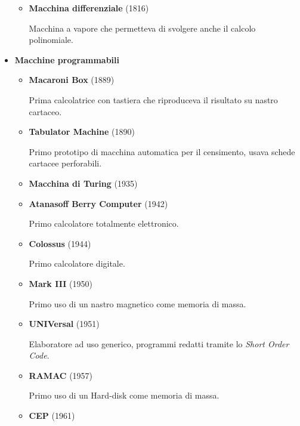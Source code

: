 \documentclass{article}
\begin{document}
\begin{itemize}
\begin{itemize}
            \item \textbf{Macchina differenziale} (1816)

                Macchina a vapore che permetteva di svolgere anche il calcolo polinomiale.\newline
            
        \end{itemize}

    \item \textbf{Macchine programmabili}
        \begin{itemize}

            \item \textbf{Macaroni Box} (1889)

                Prima calcolatrice con tastiera che riproduceva il risultato su nastro cartaceo.
        
            \item \textbf{Tabulator Machine} (1890)

                Primo prototipo di macchina automatica per il censimento, usava schede cartacee perforabili.

            \item \textbf{Macchina di Turing} (1935)

            \item \textbf{Atanasoff Berry Computer} (1942)

                Primo calcolatore totalmente elettronico.

            \item \textbf{Colossus} (1944)

                Primo calcolatore digitale. 

            \item \textbf{Mark III} (1950)

                Primo uso di un nastro magnetico come memoria di massa.

            \item \textbf{UNIVersal} (1951)

                Elaboratore ad uso generico, programmi redatti tramite lo \textit{Short Order Code}.

            \item \textbf{RAMAC} (1957)

                Primo uso di un Hard-disk come memoria di massa.

            \item \textbf{CEP} (1961)


\end{itemize}
\end{itemize}
\end{document}
